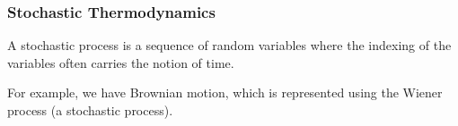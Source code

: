 \documentclass{beamer}
\begin{document}
\begin{frame}
  \frametitle{Stochastic Thermodynamics}
 \begin{definition}
  
   A stochastic process is a sequence of random variables where the indexing of the variables
   often carries the notion of time.
  
 \end{definition}
 For example, we have Brownian motion, which is represented using the Wiener process
 (a stochastic process).
  
\end{frame}
\end{document}
